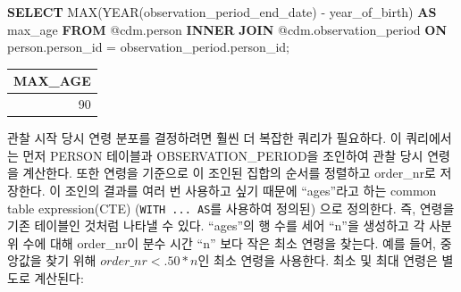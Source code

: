 \documentclass[10.5pt]{book}
\newenvironment{Shaded}{\begin{snugshade}}{\end{snugshade}}
\newcommand{\KeywordTok}[1]{\textcolor[rgb]{0.13,0.29,0.53}{\textbf{#1}}}
\newcommand{\DataTypeTok}[1]{\textcolor[rgb]{0.13,0.29,0.53}{#1}}
\newcommand{\FunctionTok}[1]{\textcolor[rgb]{0.00,0.00,0.00}{#1}}
\newcommand{\NormalTok}[1]{#1}
\theoremstyle{definition}
\theoremstyle{definition}
\theoremstyle{definition}
\theoremstyle{remark}
\begin{document}
\begin{Shaded}
\begin{Highlighting}[]
\KeywordTok{SELECT} \FunctionTok{MAX}\NormalTok{(}\DataTypeTok{YEAR}\NormalTok{(observation_period_end_date) -}
\NormalTok{           year_of_birth) }\KeywordTok{AS}\NormalTok{ max_age}
\KeywordTok{FROM}\NormalTok{ @cdm.person}
\KeywordTok{INNER} \KeywordTok{JOIN}\NormalTok{ @cdm.observation_period}
  \KeywordTok{ON}\NormalTok{ person.person_id = observation_period.person_id;}
\end{Highlighting}
\end{Shaded}

\begin{longtable}[]{@{}r@{}}
\toprule
MAX\_AGE\tabularnewline
\midrule
\endhead
90\tabularnewline
\bottomrule
\end{longtable}

관찰 시작 당시 연령 분포를 결정하려면 훨씬 더 복잡한 쿼리가 필요하다. 이
쿼리에서는 먼저 PERSON 테이블과 OBSERVATION\_PERIOD을 조인하여 관찰 당시
연령을 계산한다. 또한 연령을 기준으로 이 조인된 집합의 순서를 정렬하고
order\_nr로 저장한다. 이 조인의 결과를 여러 번 사용하고 싶기 때문에
``ages''라고 하는 common table expression(CTE) (\texttt{WITH\ ...\ AS}를
사용하여 정의된) 으로 정의한다. 즉, 연령을 기존 테이블인 것처럼 나타낼
수 있다. ``ages''의 행 수를 세어 ``n''을 생성하고 각 사분위 수에 대해
order\_nr이 분수 시간 ``n'' 보다 작은 최소 연령을 찾는다. 예를 들어,
중앙값을 찾기 위해 \(order\_nr < .50 * n\)인 최소 연령을 사용한다. 최소
및 최대 연령은 별도로 계산된다:
\end{document}
